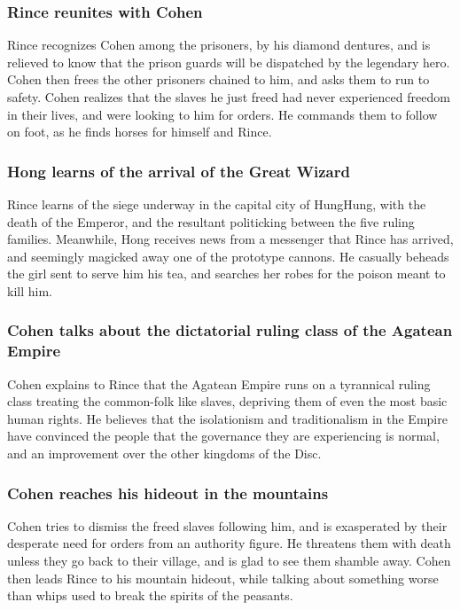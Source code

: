 \subsubsection{\Gls{Rince} reunites with \Gls{Cohen}}
\Gls{Rince} recognizes \Gls{Cohen} among the prisoners, by his diamond dentures, and is relieved to
know that the prison guards will be dispatched by the legendary hero. \Gls{Cohen} then frees the
other prisoners chained to him, and asks them to run to safety. \Gls{Cohen} realizes that the slaves
he just freed had never experienced freedom in their lives, and were looking to him for orders. He
commands them to follow on foot, as he finds horses for himself and \Gls{Rince}.

\subsubsection{\Gls{Hong} learns of the arrival of the Great Wizard}
\Gls{Rince} learns of the siege underway in the capital city of HungHung, with the death of the
Emperor, and the resultant politicking between the five ruling families. Meanwhile, \Gls{Hong}
receives news from a messenger that \Gls{Rince} has arrived, and seemingly magicked away one of the
prototype cannons. He casually beheads the girl sent to serve him his tea, and searches her robes
for the poison meant to kill him.

\subsubsection{\Gls{Cohen} talks about the dictatorial ruling class of the Agatean Empire}
\Gls{Cohen} explains to \Gls{Rince} that the Agatean Empire runs on a tyrannical ruling class
treating the common-folk like slaves, depriving them of even the most basic human rights. He
believes that the isolationism and traditionalism in the Empire have convinced the people that the
governance they are experiencing is normal, and an improvement over the other kingdoms of the Disc.

\subsubsection{\Gls{Cohen} reaches his hideout in the mountains}
\Gls{Cohen} tries to dismiss the freed slaves following him, and is exasperated by their desperate
need for orders from an authority figure. He threatens them with death unless they go back to their
village, and is glad to see them shamble away. \Gls{Cohen} then leads \Gls{Rince} to his mountain
hideout, while talking about something worse than whips used to break the spirits of the peasants.

